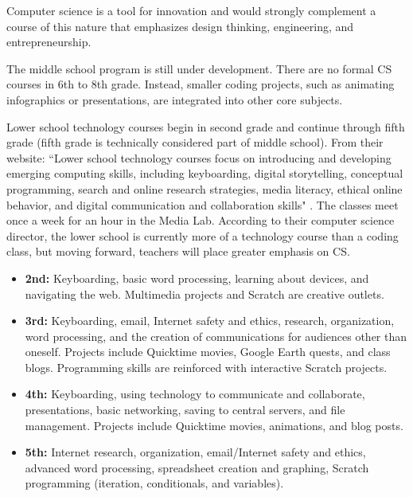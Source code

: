 Computer science is a tool for innovation and would strongly complement a course of this nature that emphasizes design thinking, engineering, and entrepreneurship.\par
The middle school program is still under development. There are no formal CS courses in 6th to 8th grade. Instead, smaller coding projects, such as animating infographics or presentations, are integrated into other core subjects.\par %
Lower school technology courses begin in second grade and continue through fifth grade (fifth grade is technically considered part of middle school). From their website: ``Lower school technology courses focus on introducing and developing emerging computing skills, including keyboarding, digital storytelling, conceptual programming, search and online research strategies, media literacy, ethical online behavior, and digital communication and collaboration skills" \cite{nuevalower}. The classes meet once a week for an hour in the Media Lab. According to their computer science director, the lower school is currently more of a technology course than a coding class, but moving forward, teachers will place greater emphasis on CS.
\begin{itemize}
	\item \textbf{2nd:} Keyboarding, basic word processing, learning about devices, and navigating the web. Multimedia projects and Scratch are creative outlets.   
	\item \textbf{3rd:} Keyboarding, email, Internet safety and ethics, research, organization, word processing, and the creation of communications for audiences other than oneself. Projects include Quicktime movies, Google Earth quests, and class blogs. Programming skills are reinforced with interactive Scratch projects. 
	\item \textbf{4th:} Keyboarding, using technology to communicate and collaborate, presentations, basic networking, saving to central servers, and file management. Projects include Quicktime movies, animations, and blog posts.\par
	\item \textbf{5th:} Internet research, organization, email/Internet safety and ethics, advanced word processing, spreadsheet creation and graphing, Scratch programming (iteration, conditionals, and variables).
\end{itemize}

